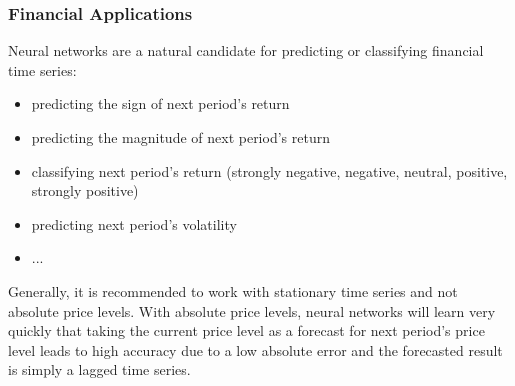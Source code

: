 \documentclass[xcolor=dvipsnames, english, 8pt]{beamer}
\begin{document}
\begin{frame}
    \frametitle{Financial Applications}
    Neural networks are a natural candidate for predicting or classifying financial time series:\vspace{0.25cm}\\
    \begin{itemize}
        \item predicting the sign of next period's return
        \item predicting the magnitude of next period's return
        \item classifying next period's return (strongly negative, negative, neutral, positive, strongly positive)
        \item predicting next period's volatility
        \item ...\vspace{0.25cm}\\

    \end{itemize}

    Generally, it is recommended to work with {\color{ubRed}stationary time series} and {\color{ubRed}not absolute price levels}. With absolute price levels, neural networks will learn very quickly that taking the current price level as a forecast for next period's price level leads to high accuracy due to a low absolute error and the forecasted result is simply a {\color{ubRed}lagged time series}.
\end{frame}
\end{document}
